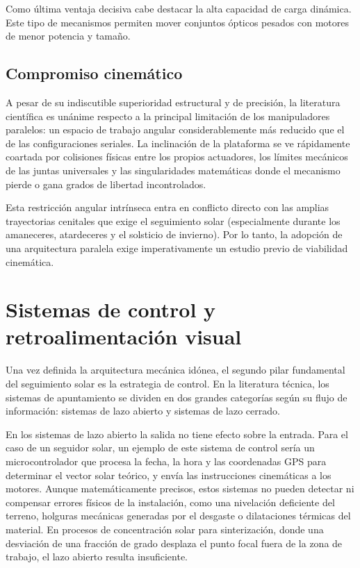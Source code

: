 Como última ventaja decisiva cabe destacar la alta capacidad de carga dinámica. Este tipo de mecanismos permiten mover conjuntos ópticos pesados con motores de menor potencia y tamaño.

\subsection{Compromiso cinemático}
A pesar de su indiscutible superioridad estructural y de precisión, la literatura científica es unánime respecto a la principal limitación de los manipuladores paralelos: un espacio de trabajo angular considerablemente más reducido que el de las configuraciones seriales. La inclinación de la plataforma se ve rápidamente coartada por colisiones físicas entre los propios actuadores, los límites mecánicos de las juntas universales y las singularidades matemáticas donde el mecanismo pierde o gana grados de libertad incontrolados.

Esta restricción angular intrínseca entra en conflicto directo con las amplias trayectorias cenitales que exige el seguimiento solar (especialmente durante los amaneceres, atardeceres y el solsticio de invierno). Por lo tanto, la adopción de una arquitectura paralela exige imperativamente un estudio previo de viabilidad cinemática.

\section{Sistemas de control y retroalimentación visual}
Una vez definida la arquitectura mecánica idónea, el segundo pilar fundamental del seguimiento solar es la estrategia de control. En la literatura técnica, los sistemas de apuntamiento se dividen en dos grandes categorías según su flujo de información: sistemas de lazo abierto y sistemas de lazo cerrado.

En los sistemas de lazo abierto la salida no tiene efecto sobre la entrada. Para el caso de un seguidor solar, un ejemplo de este sistema de control sería un microcontrolador que procesa la fecha, la hora y las coordenadas GPS para determinar el vector solar teórico, y envía las instrucciones cinemáticas a los motores. Aunque matemáticamente precisos, estos sistemas no pueden detectar ni compensar errores físicos de la instalación, como una nivelación deficiente del terreno, holguras mecánicas generadas por el desgaste o dilataciones térmicas del material. En procesos de concentración solar para sinterización, donde una desviación de una fracción de grado desplaza el punto focal fuera de la zona de trabajo, el lazo abierto resulta insuficiente.

